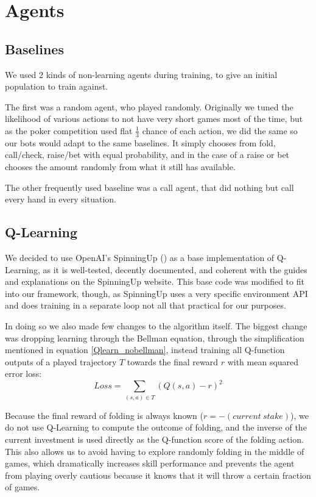 \section{Agents}

\subsection{Baselines}
We used 2 kinds of non-learning agents during training, to give an initial population to train against.

The first was a random agent, who played randomly. Originally we tuned the likelihood of various actions to not have very short games most of the time, but as the poker competition used flat $\frac{1}{3}$ chance of each action, we did the same so our bots would adapt to the same baselines. It simply chooses from {fold, call/check, raise/bet} with equal probability, and in the case of a raise or bet chooses the amount randomly from what it still has available.

The other frequently used baseline was a call agent, that did nothing but call every hand in every situation.

\subsection{Q-Learning}
We decided to use OpenAI's SpinningUp (\cite{SpinningUp2018}) as a base implementation of Q-Learning, as it is well-tested, decently documented, and coherent with the guides and explanations on the SpinningUp website. This base code was modified to fit into our framework, though, as SpinningUp uses a very specific environment API and does training in a separate loop not all that practical for our purposes.

In doing so we also made few changes to the algorithm itself. The biggest change was dropping learning through the Bellman equation, through the simplification mentioned in equation \ref{Qlearn_nobellman}, instead training all Q-function outputs of a played trajectory $T$ towards the final reward $r$ with mean squared error loss:
\begin{equation}
    Loss = \sum_{(s, a) \in T} (Q(s, a) - r)^2
\end{equation}

Because the final reward of folding is always known ($r = -(current\ stake)$), we do not use Q-Learning to compute the outcome of folding, and the inverse of the current investment is used directly as the Q-function score of the folding action. This also allows us to avoid having to explore randomly folding in the middle of games, which dramatically increases skill performance and prevents the agent from playing overly cautious because it knows that it will throw a certain fraction of games.

